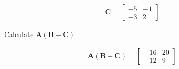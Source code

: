 \begin{align*}
    \boldsymbol{C} = \begin{bmatrix}
    -5 & -1 \\ -3 & 2
    \end{bmatrix}
\end{align*}

Calculate $\boldsymbol{A}(\boldsymbol{B} + \boldsymbol{C})$

\begin{solution}
\begin{align*}
    \boldsymbol{A}(\boldsymbol{B} + \boldsymbol{C}) = \begin{bmatrix}
    -16 & 20 \\
    -12 & 9
    \end{bmatrix}
\end{align*}
\end{solution}